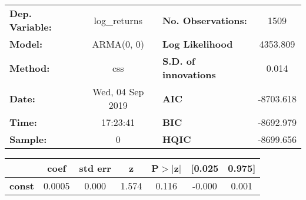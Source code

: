 \begin{center}
\begin{tabular}{lclc}
\toprule
\textbf{Dep. Variable:} &   log\_returns   & \textbf{  No. Observations:  } &    1509     \\
\textbf{Model:}         &    ARMA(0, 0)    & \textbf{  Log Likelihood     } &  4353.809   \\
\textbf{Method:}        &       css        & \textbf{  S.D. of innovations} &   0.014     \\
\textbf{Date:}          & Wed, 04 Sep 2019 & \textbf{  AIC                } & -8703.618   \\
\textbf{Time:}          &     17:23:41     & \textbf{  BIC                } & -8692.979   \\
\textbf{Sample:}        &        0         & \textbf{  HQIC               } & -8699.656   \\
\bottomrule
\end{tabular}
\begin{tabular}{lcccccc}
               & \textbf{coef} & \textbf{std err} & \textbf{z} & \textbf{P$> |$z$|$} & \textbf{[0.025} & \textbf{0.975]}  \\
\midrule
\textbf{const} &       0.0005  &        0.000     &     1.574  &         0.116        &       -0.000    &        0.001     \\
\bottomrule
\end{tabular}
\end{center}
